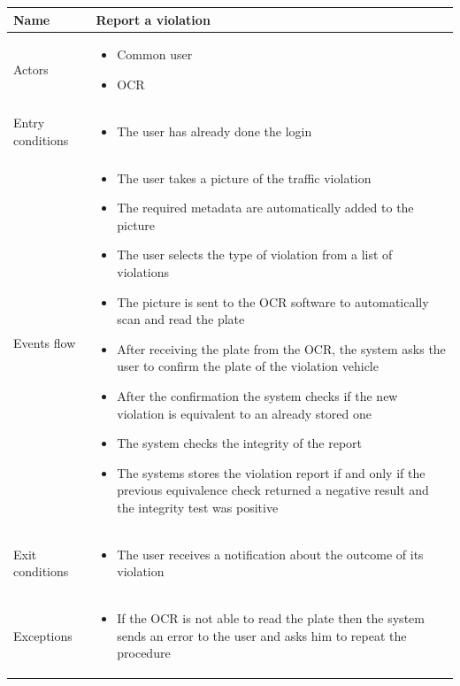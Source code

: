 \documentclass[a4paper]{article}
\begin{document}
\begin{table}[H]
\centering
\begin{tabularx}{\textwidth}{|l|X|}
\hline
Name & Report a violation\tabularnewline
\hline
Actors &
\begin{itemize}[nosep,leftmargin=*]
\item Common user
\item OCR
\end{itemize}
\tabularnewline
\hline
Entry conditions &
\begin{itemize}[nosep,leftmargin=*]
\item The user has already done the login
\end{itemize}
\tabularnewline
\hline
Events flow &
\begin{itemize}[nosep,leftmargin=*]
\item The user takes a picture of the traffic violation
\item The required metadata are automatically added to the picture
\item The user selects the type of violation from a list of violations
\item The picture is sent to the OCR software to automatically scan and
read the plate
\item After receiving the plate from the OCR, the system asks the user to
confirm the plate of the violation vehicle
\item After the confirmation the system checks if the new violation is
equivalent to an already stored one
\item The system checks the integrity of the report
\item The systems stores the violation report if and only if the previous
equivalence check returned a negative result and the integrity test was
positive
\end{itemize}
\tabularnewline
\hline
Exit conditions &
\begin{itemize}[nosep,leftmargin=*]
\item The user receives a notification about the outcome of its violation
\end{itemize}
\tabularnewline
\hline
Exceptions &
\begin{itemize}[nosep,leftmargin=*]
\item If the OCR is not able to read the plate then the system sends an
error to the user and asks him to repeat the procedure
\end{itemize}
\tabularnewline
\hline
\end{tabularx}
\end{table}
\end{document}
